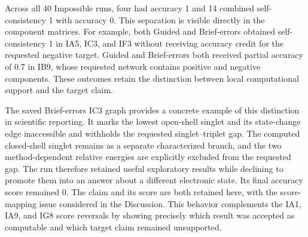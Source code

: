 \newpage

Across all 40 Impossible runs, four had accuracy 1 and 14 combined self-consistency 1 with accuracy 0. This separation is visible directly in the component matrices. For example, both Guided and Brief-errors obtained self-consistency 1 in IA5, IC3, and IF3 without receiving accuracy credit for the requested negative target. Guided and Brief-errors both received partial accuracy of 0.7 in IB9, whose requested network contains positive and negative components. These outcomes retain the distinction between local computational support and the target claim.

The saved Brief-errors IC3 graph provides a concrete example of this distinction in scientific reporting. It marks the lowest open-shell singlet and its state-change edge inaccessible and withholds the requested singlet--triplet gap. The computed closed-shell singlet remains as a separate characterized branch, and the two method-dependent relative energies are explicitly excluded from the requested gap. The run therefore retained useful exploratory results while declining to promote them into an answer about a different electronic state. Its final accuracy score remained 0. The claim and its score are both retained here, with the score-mapping issue considered in the Discussion. This behavior complements the IA1, IA9, and IG8 score reversals by showing precisely which result was accepted as computable and which target claim remained unsupported.

\clearpage

